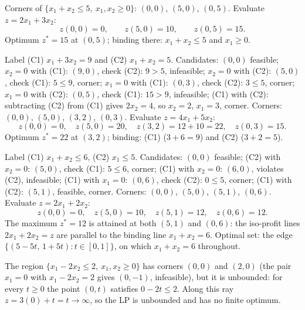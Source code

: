 \begin{solutions}
  \item Corners of $\{x_{1}+x_{2}\le 5,\ x_{1},x_{2}\ge 0\}$: $(0,0)$,
        $(5,0)$, $(0,5)$. Evaluate $z=2x_{1}+3x_{2}$:
        \[
          z(0,0)=0,\qquad z(5,0)=10,\qquad z(0,5)=15 .
        \]
        Optimum $z^{*}=15$ at $(0,5)$; binding there:
        $x_{1}+x_{2}\le 5$ and $x_{1}\ge 0$.

  \item Label (C1) $x_{1}+3x_{2}=9$ and (C2) $x_{1}+x_{2}=5$.
        Candidates: $(0,0)$ feasible; $x_{2}=0$ with (C1): $(9,0)$,
        check (C2): $9>5$, infeasible; $x_{2}=0$ with (C2): $(5,0)$,
        check (C1): $5\le 9$, corner; $x_{1}=0$ with (C1): $(0,3)$,
        check (C2): $3\le 5$, corner; $x_{1}=0$ with (C2): $(0,5)$,
        check (C1): $15>9$, infeasible; (C1) with (C2): subtracting
        (C2) from (C1) gives $2x_{2}=4$, so $x_{2}=2$, $x_{1}=3$,
        corner. Corners: $(0,0)$, $(5,0)$, $(3,2)$, $(0,3)$. Evaluate
        $z=4x_{1}+5x_{2}$:
        \[
          z(0,0)=0,\quad z(5,0)=20,\quad z(3,2)=12+10=22,\quad
          z(0,3)=15 .
        \]
        Optimum $z^{*}=22$ at $(3,2)$; binding: (C1) ($3+6=9$) and
        (C2) ($3+2=5$).

  \item Label (C1) $x_{1}+x_{2}\le 6$, (C2) $x_{1}\le 5$. Candidates:
        $(0,0)$ feasible; (C2) with $x_{2}=0$: $(5,0)$, check (C1):
        $5\le 6$, corner; (C1) with $x_{2}=0$: $(6,0)$, violates (C2),
        infeasible; (C1) with $x_{1}=0$: $(0,6)$, check (C2):
        $0\le 5$, corner; (C1) with (C2): $(5,1)$, feasible, corner.
        Corners: $(0,0)$, $(5,0)$, $(5,1)$, $(0,6)$. Evaluate
        $z=2x_{1}+2x_{2}$:
        \[
          z(0,0)=0,\quad z(5,0)=10,\quad z(5,1)=12,\quad z(0,6)=12 .
        \]
        The maximum $z^{*}=12$ is attained at both $(5,1)$ and
        $(0,6)$: the iso-profit lines $2x_{1}+2x_{2}=z$ are parallel
        to the binding line $x_{1}+x_{2}=6$. Optimal set: the edge
        $\{(5-5t,\,1+5t):t\in[0,1]\}$, on which $x_{1}+x_{2}=6$
        throughout.

  \item The region $\{x_{1}-2x_{2}\le 2,\ x_{1},x_{2}\ge 0\}$ has
        corners $(0,0)$ and $(2,0)$ (the pair $x_{1}=0$ with
        $x_{1}-2x_{2}=2$ gives $(0,-1)$, infeasible), but it is
        unbounded: for every $t\ge 0$ the point $(0,t)$ satisfies
        $0-2t\le 2$. Along this ray $z=3(0)+t=t\to\infty$, so the LP
        is unbounded and has no finite optimum.


\end{solutions}
